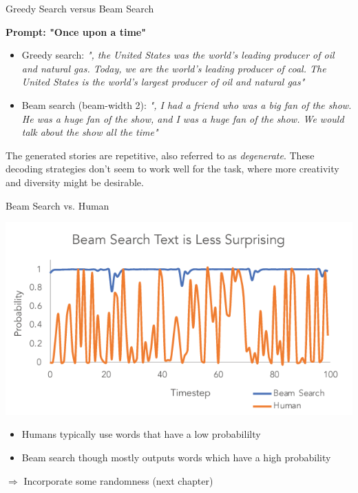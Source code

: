 \begin{vbframe}{Greedy Search versus Beam Search}

\vspace{2ex}
\textbf{Prompt: "Once upon a time"}
\begin{itemize}
\item Greedy search: \textit{", the United States was the world's leading producer of oil and natural gas. Today, we are the world's leading producer of coal. 
The United States is the world's largest producer of oil and natural gas"}
\item Beam search (beam-width 2): \textit{", I had a friend who was a big fan of the show. He was a huge fan of the show, and I was a huge fan of the show. We would talk about the show all the time"}
\end{itemize}
\vspace{2ex}
The generated stories are repetitive, also referred to as \textit{degenerate}. These decoding strategies don't seem to work well for the task, where more creativity and diversity might be desirable.\\
\vspace{2ex}



\end{vbframe}


\begin{frame}{Beam Search vs. Human}
\begin{center}
    \includegraphics[width=0.7\linewidth]{figure/beam_vs_human.png}
\end{center}

\begin{itemize}
    \item Humans typically use words that have a low probabililty
    \item Beam search though mostly outputs words which have a high probability
\end{itemize}

\vfill

$\Rightarrow$ Incorporate some randomness (next chapter)

\end{frame}

